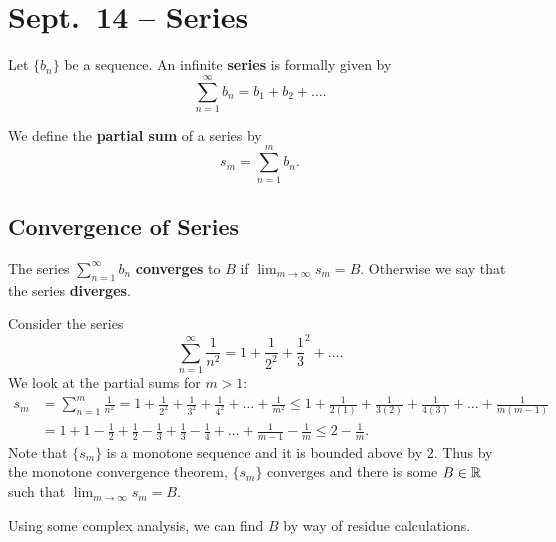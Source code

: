 \chapter{Sept.~14 -- Series}

\begin{definition}
  Let $\{b_n\}$ be a sequence. An infinite \textbf{series}
  is formally given by
  \[
    \sum_{n = 1}^\infty b_n = b_1 + b_2 + \dots
  .\]
\end{definition}

\begin{definition}
  We define the \textbf{partial sum} of a series by
  \[s_m = \sum_{n = 1}^m b_n.\]
\end{definition}

\section{Convergence of Series}

\begin{definition}
  The series $\sum_{n=1}^\infty{b_n}$ \textbf{converges}
  to $B$ if $\lim_{m \to \infty} s_m = B$. Otherwise
  we say that the series \textbf{diverges}.
\end{definition}

\begin{example}
  Consider the series
  \[\sum_{n = 1}^{\infty} \frac{1}{n^2} = 1 + \frac{1}{2^2} + \frac{1}{3}^2 + \dots.\]
  We look at the partial sums for $m > 1$:
  \begin{align*}
    s_m &= \sum_{n = 1}^{m} \frac{1}{n^2} = 1 + \frac{1}{2^2} + \frac{1}{3^2} + \frac{1}{4^2} + \dots + \frac{1}{m^2}
    \le 1 + \frac{1}{2(1)} + \frac{1}{3(2)} + \frac{1}{4(3)} + \dots + \frac{1}{m(m-1)} \\
        &= 1 + 1 - \frac{1}{2} + \frac{1}{2} - \frac{1}{3} + \frac{1}{3} - \frac{1}{4} + \dots + \frac{1}{m-1} - \frac{1}{m}
        \le 2 - \frac{1}{m}.
  \end{align*}
  Note that $\{s_m\}$ is a monotone sequence and it is
  bounded above by $2$. Thus by the monotone convergence
  theorem, $\{s_m\}$ converges and there is some
  $B \in \mathbb{R}$ such that
  $\lim_{m \to \infty} s_m = B$.
\end{example}

\begin{remark}
  Using some complex analysis, we can find $B$ by way of
  residue calculations.
\end{remark}

